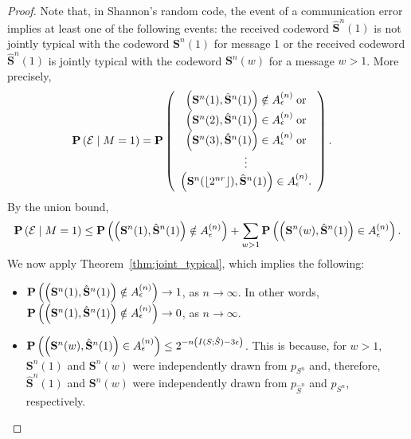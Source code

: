 \begin{proof}
Note that, in Shannon's random code, the event of a communication error implies at least one of the following events: the received codeword $\hat{\mathbf{S}}^n(1)$ is not jointly typical with the codeword $\mathbf{S}^n(1)$ for message 1 or the received codeword $\hat{\mathbf{S}}^n(1)$ is jointly typical with the codeword $\mathbf{S}^n(w)$ for a message $w > 1$. More precisely,
%
\begin{align*}
\mathbf{P}\left(\mathcal{E} \mid M = 1\right) &= \mathbf{P}\left(
\begin{array}{c}
\left(\mathbf{S}^n(1), \hat{\mathbf{S}}^n(1)\right) \notin A^{(n)}_{\epsilon} \; \text{or}\\
\left(\mathbf{S}^n(2), \hat{\mathbf{S}}^n(1)\right) \in A^{(n)}_{\epsilon} \; \text{or}\\
\left(\mathbf{S}^n(3), \hat{\mathbf{S}}^n(1)\right) \in A^{(n)}_{\epsilon} \; \text{or}\\
\vdots\\
\left(\mathbf{S}^n(\lfloor2^{nr}\rfloor), \hat{\mathbf{S}}^n(1)\right) \in A^{(n)}_{\epsilon}.
\end{array}
\right).
\end{align*}
%
By the union bound,
%
$$\mathbf{P}\left(\mathcal{E} \mid M = 1\right) \leq \mathbf{P}\left(\left(\mathbf{S}^n(1), \hat{\mathbf{S}}^n(1)\right) \notin A^{(n)}_{\epsilon}\right) + \sum_{w > 1}\mathbf{P}\left(\left(\mathbf{S}^n(w), \hat{\mathbf{S}}^n(1)\right) \in A^{(n)}_{\epsilon}\right).$$
%
We now apply Theorem~\ref{thm:joint_typical}, which implies the following:

\begin{itemize}
\item $\mathbf{P}\left(\left(\mathbf{S}^n(1), \hat{\mathbf{S}}^n(1)\right) \notin A^{(n)}_{\epsilon}\right) \to 1$, as $n \to \infty$. In other words, $\mathbf{P}\left(\left(\mathbf{S}^n(1), \hat{\mathbf{S}}^n(1)\right) \notin A^{(n)}_{\epsilon}\right) \to 0$, as $n \to \infty$.
\item $\mathbf{P}\left(\left(\mathbf{S}^n(w), \hat{\mathbf{S}}^n(1)\right) \in A^{(n)}_{\epsilon}\right) \leq 2^{-n\left(I(S;\hat{S})-3\epsilon\right)}$. This is because, for $w > 1$, $\mathbf{S}^n(1)$ and $\mathbf{S}^n(w)$ were independently drawn from $p_{S^n}$ and, therefore, $\hat{\mathbf{S}}^n(1)$ and $\mathbf{S}^n(w)$ were independently drawn from $p_{\hat{S}^n}$ and $p_{S^n}$, respectively.
\end{itemize}


\end{proof}
